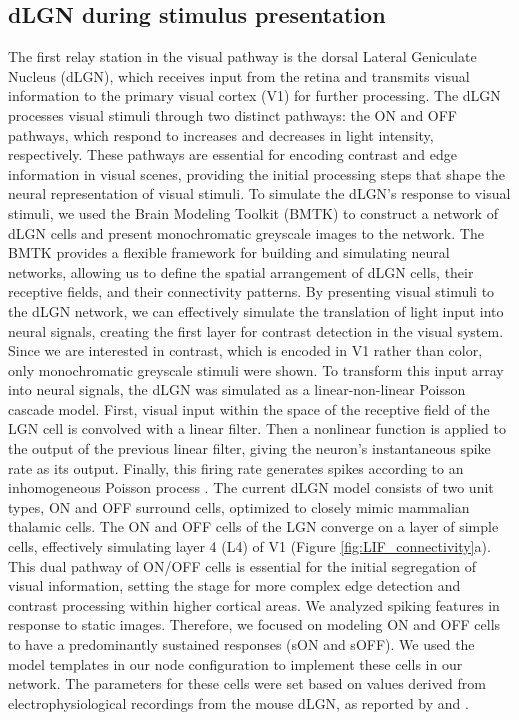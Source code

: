 \documentclass[12pt]{article}
\begin{document}
\subsection{dLGN during stimulus presentation}
The first relay station in the visual pathway is the dorsal Lateral Geniculate Nucleus (dLGN), which receives input from the retina and transmits visual information to the primary visual cortex (V1) for further processing. The dLGN processes visual stimuli through two distinct pathways: the ON and OFF pathways, which respond to increases and decreases in light intensity, respectively. These pathways are essential for encoding contrast and edge information in visual scenes, providing the initial processing steps that shape the neural representation of visual stimuli. To simulate the dLGN's response to visual stimuli, we used the Brain Modeling Toolkit (BMTK) to construct a network of dLGN cells and present monochromatic greyscale images to the network. The BMTK provides a flexible framework for building and simulating neural networks, allowing us to define the spatial arrangement of dLGN cells, their receptive fields, and their connectivity patterns. By presenting visual stimuli to the dLGN network, we can effectively simulate the translation of light input into neural signals, creating the first layer for contrast detection in the visual system. Since we are interested in contrast, which is encoded in V1 rather than color, only monochromatic greyscale stimuli were shown. To transform this input array into neural signals, the dLGN was simulated as a linear-non-linear Poisson cascade model. First, visual input within the space of the receptive field of the LGN cell is convolved with a linear filter. Then a nonlinear function is applied to the output of the previous linear filter, giving the neuron's instantaneous spike rate as its output. Finally, this firing rate generates spikes according to an inhomogeneous Poisson process \autocite{moskovitzComparisonDeepLearning2018}. The current dLGN model consists of two unit types, ON and OFF surround cells, optimized to closely mimic mammalian thalamic cells. The ON and OFF cells of the LGN converge on a layer of simple cells, effectively simulating layer 4 (L4) of V1 (Figure \ref{fig:LIF_connectivity}a). This dual pathway of ON/OFF cells is essential for the initial segregation of visual information, setting the stage for more complex edge detection and contrast processing within higher cortical areas. We analyzed spiking features in response to static images. Therefore, we focused on modeling ON and OFF cells to have a predominantly sustained responses (sON and sOFF). We used the model templates in our node configuration to implement these cells in our network. The parameters for these cells were set based on values derived from electrophysiological recordings from the mouse dLGN, as reported by \textcite{durandComparisonVisualResponse2016} and \textcite{billehSystematicIntegrationStructural2020}.
\end{document}

